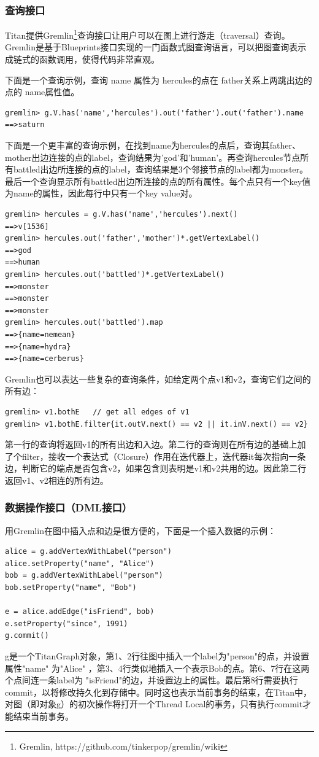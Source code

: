 \subsubsection{查询接口}
Titan提供Gremlin\footnote{Gremlin, https://github.com/tinkerpop/gremlin/wiki}查询接口让用户可以在图上进行游走（traversal）查询。Gremlin是基于Blueprints接口实现的一门函数式图查询语言，可以把图查询表示成链式的函数调用，使得代码非常直观。

下面是一个查询示例，查询 name 属性为 hercules的点在 father关系上两跳出边的点的 name属性值。
\begin{lstlisting}
gremlin> g.V.has('name','hercules').out('father').out('father').name
==>saturn
\end{lstlisting}

下面是一个更丰富的查询示例，在找到name为hercules的点后，查询其father、mother出边连接的点的label，查询结果为'god'和'human'。再查询hercules节点所有battled出边所连接的点的label，查询结果是3个邻接节点的label都为monster。最后一个查询显示所有battled出边所连接的点的所有属性。每个点只有一个key值为name的属性，因此每行中只有一个key value对。
\begin{lstlisting}
gremlin> hercules = g.V.has('name','hercules').next()
==>v[1536]
gremlin> hercules.out('father','mother')*.getVertexLabel()
==>god
==>human
gremlin> hercules.out('battled')*.getVertexLabel()
==>monster
==>monster
==>monster
gremlin> hercules.out('battled').map
==>{name=nemean}
==>{name=hydra}
==>{name=cerberus}
\end{lstlisting}

Gremlin也可以表达一些复杂的查询条件，如给定两个点v1和v2，查询它们之间的所有边：
\begin{lstlisting}
gremlin> v1.bothE   // get all edges of v1
gremlin> v1.bothE.filter{it.outV.next() == v2 || it.inV.next() == v2}
\end{lstlisting}
第一行的查询将返回v1的所有出边和入边。第二行的查询则在所有边的基础上加了个filter，接收一个表达式（Closure）作用在迭代器上，迭代器it每次指向一条边，判断它的端点是否包含v2，如果包含则表明是v1和v2共用的边。因此第二行返回v1、v2相连的所有边。


\subsubsection{数据操作接口（DML接口）}
用Gremlin在图中插入点和边是很方便的，下面是一个插入数据的示例：
\begin{lstlisting}
alice = g.addVertexWithLabel("person")
alice.setProperty("name", "Alice")
bob = g.addVertexWithLabel("person")
bob.setProperty("name", "Bob")

e = alice.addEdge("isFriend", bob)
e.setProperty("since", 1991)
g.commit()
\end{lstlisting}
g是一个TitanGraph对象，第1、2行往图中插入一个label为"person"的点，并设置属性"name" 为"Alice" ，第3、4行类似地插入一个表示Bob的点。第6、7行在这两个点间连一条label为 "isFriend"的边，并设置边上的属性。最后第8行需要执行commit，以将修改持久化到存储中。同时这也表示当前事务的结束，在Titan中，对图（即对象g）的初次操作将打开一个Thread Local的事务，只有执行commit才能结束当前事务。

